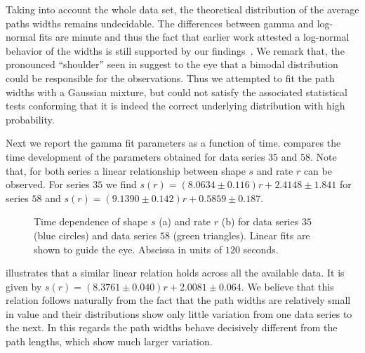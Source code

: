 		Taking into account the whole data set, the theoretical distribution of the average paths widths remains undecidable. The differences between gamma and log-normal fits are minute and thus the fact that earlier work attested a log-normal behavior of the widths is still supported by our findings~\cite{baumgarten2010plasmodial}. We remark that, the pronounced ``shoulder'' seen in  suggest to the eye that a bimodal distribution could be responsible for the observations. Thus we attempted to fit the path widths with a Gaussian mixture, but could not satisfy the associated statistical tests conforming that it is indeed the correct underlying distribution with high probability.

		Next we report the gamma fit parameters as a function of time.  compares the time development of the parameters obtained for data series $35$ and $58$. Note that, for both series a linear relationship between shape $s$ and rate $r$ can be observed. For series $35$ we find $s(r) = (8.0634 \pm 0.116) r + 2.4148 \pm 1.841$ for series $58$ and $s(r) = (9.1390 \pm 0.142) r + 0.5859 \pm 0.187$.
		
		\begin{figure}
			\centering

			\caption[Path width distribution fit parameters.]{Time dependence of shape $s$ (a) and rate $r$ (b) for data series $35$ (blue circles) and data series $58$ (green triangles). Linear fits are shown to guide the eye. Abscissa in units of $120$ seconds.}
			\label{fig:path_width_fit_parameters}
		\end{figure}


		 illustrates that a similar linear relation holds across all the available data. It is given by $s(r) = (8.3761 \pm 0.040) r + 2.0081 \pm 0.064$. We believe that this relation follows naturally from the fact that the path widths are relatively small in value and their distributions show only little variation from one data series to the next. In this regards the path widths behave decisively different from the path lengths, which show much larger variation.

